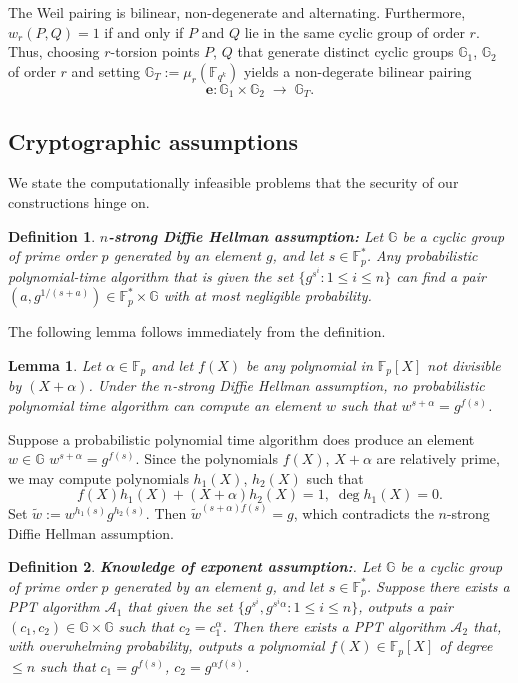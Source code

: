 \documentclass[11pt, lettersize, notitlepage, leqno, footskip=0.6cm]{article}
\newcommand{\bFp}{\mathbb{F}_p}
\newcommand{\bFqk}{\mathbb{F}_{q^k}}
\newcommand{\lra}{\longrightarrow}
\newcommand{\wti}{\widetilde}
\newcommand{\mc}{\mathcal}
\newcommand{\mb}{\mathbb}
\newcommand{\e}{\mathbf{e}}
\newcommand{\al}{\alpha}
\newcommand{\vs}{\vspace{-0.15cm}}
\newtheorem{Lem}[Thm]{Lemma}
\newtheorem{Def}{Definition}[section]
\numberwithin{equation}{section}
\begin{document}
The Weil pairing is bilinear, non-degenerate and alternating. Furthermore, $w_r(P,Q) = 1$ if and only if $P$ and $Q$ lie in the same cyclic group of order $r$. Thus, choosing $r$-torsion points $P$, $Q$ that generate distinct cyclic groups $\mb{G}_1$, $\mb{G}_2$ of order $r$ and setting $\mb{G}_T:= \mu_r(\bFqk)$ yields a non-degerate bilinear pairing \vs $$\e: \mb{G}_1\times\mb{G}_2 \;\lra\; \mb{G}_T .$$    





\subsection{\fontsize{11}{11}\selectfont Cryptographic assumptions}

We state the computationally infeasible problems that the security of our constructions hinge on.

\begin{Def} {\normalfont \textbf{{$n$-strong Diffie Hellman assumption:}}} Let $\mb{G}$ be a cyclic group of prime order $p$ generated by an element $g$, and let $s \in \bFp^*$. Any probabilistic polynomial-time algorithm that is given the set $\{g^{s^i}: 1\leq i\leq n \}$ can find a pair $(a, g^{1/(s+a)})\in \bFp^*\times \mb{G}$ with at most negligible probability.\end{Def}

\noindent The following lemma follows immediately from the definition.

\begin{Lem} Let $\al\in \bFp$ and let $f(X)$ be any polynomial in $\bFp[X]$ not divisible by $(X+\al)$. Under the $n$-strong Diffie Hellman assumption, no probabilistic polynomial time algorithm can compute an element $w$ such that $w^{s+\al} = g^{f(s)}$.\end{Lem}

\begin{prf} Suppose a probabilistic polynomial time algorithm does produce an element $w\in \mb{G}$ $w^{s+\al} = g^{f(s)}$. Since the polynomials $f(X)$, $X+\al$ are relatively prime, we may compute polynomials $h_1(X)$, $h_2(X)$ such that $$f(X)h_1(X)+(X+\al)h_2(X) = 1,\; \deg h_1(X) = 0 .$$ Set $\wti{w}:= w^{h_1(s)}g^{h_2(s)}$. Then $\wti{w}^{(s+\al)f(s)} = g$, which contradicts the $n$-strong Diffie Hellman assumption.\end{prf}

\begin{Def} {\normalfont \textbf{{Knowledge of exponent assumption:}}}. Let $\mb{G}$ be a cyclic group of prime order $p$ generated by an element $g$, and let $s \in \bFp^*$. Suppose there exists a PPT algorithm $\mc{A}_1$ that given the set $\{g^{s^i}, g^{s^i\al}: 1\leq i\leq n \}$, outputs a pair $(c_1, c_2)\in \mb{G}\times\mb{G}$ such that $c_2 = c_1^{\al}$. Then there exists a PPT algorithm $\mc{A}_2$ that, with overwhelming probability, outputs a polynomial $f(X)\in \bFp[X]$ of degree $\leq n$ such that $c_1 = g^{f(s)}$, $c_2 = g^{\al f(s)}$.\end{Def}
\end{document}
